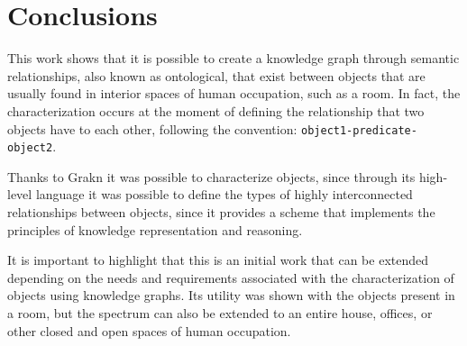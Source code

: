 \section{Conclusions}
This work shows that it is possible to create a knowledge graph through 
semantic relationships, also known as ontological, that exist between objects 
that are usually found in interior spaces of human occupation, such as a room. 
In fact, the characterization occurs at the moment of defining the relationship 
that two objects have to each other, following the convention: 
\texttt{object1-predicate-object2}.

Thanks to Grakn it was possible to characterize objects, since through its 
high-level language it was possible to define the types of highly interconnected 
relationships between objects, since it provides a scheme that implements the 
principles of knowledge representation and reasoning.

It is important to highlight that this is an initial work that can be extended 
depending on the needs and requirements associated with the characterization 
of objects using knowledge graphs. Its utility was shown with the objects 
present in a room, but the spectrum can also be extended to an entire house, 
offices, or other closed and open spaces of human occupation.

